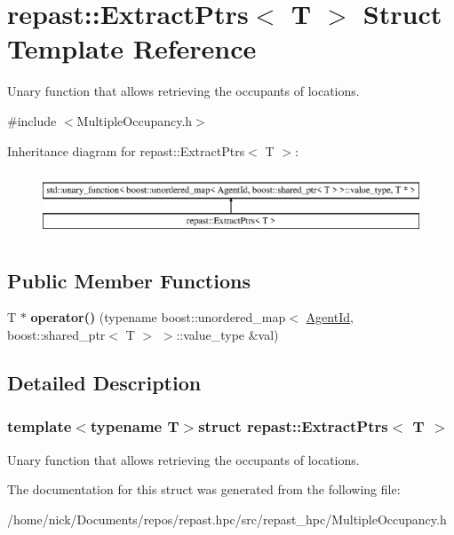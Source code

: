 \hypertarget{structrepast_1_1_extract_ptrs}{\section{repast\-:\-:Extract\-Ptrs$<$ T $>$ Struct Template Reference}
\label{structrepast_1_1_extract_ptrs}
}


Unary function that allows retrieving the occupants of locations.  




{\ttfamily \#include $<$Multiple\-Occupancy.\-h$>$}

Inheritance diagram for repast\-:\-:Extract\-Ptrs$<$ T $>$\-:\begin{figure}[H]
\begin{center}
\leavevmode
\includegraphics[height=1.944445cm]{structrepast_1_1_extract_ptrs}
\end{center}
\end{figure}
\subsection*{Public Member Functions}
\begin{DoxyCompactItemize}
\item 
\hypertarget{structrepast_1_1_extract_ptrs_a5f865f44030fee1a36179d9121841b9d}{T $\ast$ {\bfseries operator()} (typename boost\-::unordered\-\_\-map$<$ \hyperlink{classrepast_1_1_agent_id}{Agent\-Id}, boost\-::shared\-\_\-ptr$<$ T $>$ $>$\-::value\-\_\-type \&val)}\label{structrepast_1_1_extract_ptrs_a5f865f44030fee1a36179d9121841b9d}

\end{DoxyCompactItemize}


\subsection{Detailed Description}
\subsubsection*{template$<$typename T$>$struct repast\-::\-Extract\-Ptrs$<$ T $>$}

Unary function that allows retrieving the occupants of locations. 

The documentation for this struct was generated from the following file\-:\begin{DoxyCompactItemize}
\item 
/home/nick/\-Documents/repos/repast.\-hpc/src/repast\-\_\-hpc/Multiple\-Occupancy.\-h\end{DoxyCompactItemize}
